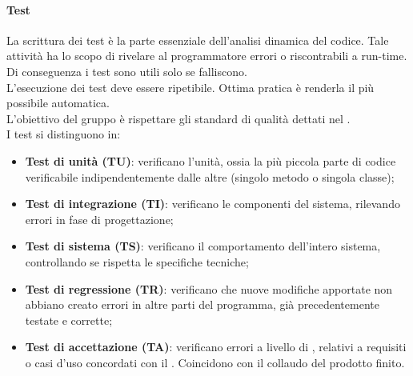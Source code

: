 \paragraph{Test} 
La scrittura dei test è la parte essenziale dell'analisi dinamica del codice. Tale attività ha lo scopo di rivelare al programmatore errori o  riscontrabili a run-time. Di conseguenza i test sono utili solo se falliscono. \\
L'esecuzione dei test deve essere ripetibile. Ottima pratica è renderla il più possibile automatica. \\
L'obiettivo del gruppo è rispettare gli standard di qualità dettati nel \PdQv{}. \\
I test si distinguono in:
\begin{itemize}
	\item \textbf{Test di unità (TU)}: verificano l'unità, ossia la più piccola parte di codice verificabile indipendentemente dalle altre (singolo metodo o singola classe);
	\item \textbf{Test di integrazione (TI)}: verificano le componenti del sistema, rilevando errori in fase di progettazione;
	\item \textbf{Test di sistema (TS)}: verificano il comportamento dell'intero sistema, controllando se rispetta le specifiche tecniche;
	\item \textbf{Test di regressione (TR)}: verificano che nuove modifiche apportate non abbiano creato errori in altre parti del programma, già precedentemente testate e corrette;
	\item \textbf{Test di accettazione (TA)}: verificano errori a livello di , relativi a requisiti o casi d'uso concordati con il . Coincidono con il collaudo del prodotto finito.
\end{itemize}

